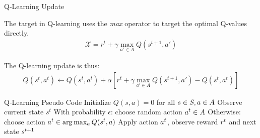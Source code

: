 \begin{frame}{Q-Learning Update}

    The target in Q-learning uses the \textit{max} operator to target the optimal Q-values directly. 
    \vspace{00pt}
    \begin{align*}
        \mathcal{X} = r^{t} + \gamma \max_{a' \in A}Q(s^{t+1}, a')
    \end{align*}

    The Q-learning update is thus:
    \vspace{0pt}
    \begin{align*}
        Q(s^t, a^t) \gets Q(s^t, a^t) + \alpha \left[ r^t + \gamma \max_{a' \in A} Q(s^{t+1}, a') - Q(s^t, a^t) \right]
    \end{align*}
    
\end{frame}

\begin{frame}{Q-Learning Pseudo Code}
    \centering
        \State Initialize $Q(s, a) = 0$  for all $s \in S, a \in A$
                \State Observe current state $s^t$
                \State With probability $\epsilon$: choose random action $a^t \in A$
                \State Otherwise: choose action $a^t \in \arg\max_{a} Q(s^t, a)$
                \State Apply action $a^t$, observe reward $r^t$ and next state $s^{t+1}$
                \State {}
            \EndFor
        \EndFor
    \ealg
\end{frame}


